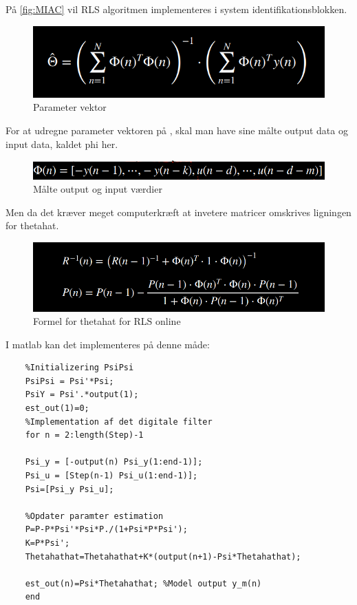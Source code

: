 På \autoref{fig:MIAC} vil RLS algoritmen implementeres i system identifikationsblokken.

\begin{figure}[H]
	\centering
	\includegraphics[width = 400pt]{Img/ParameterVektor.png}
	\caption{Parameter vektor}
	\label{fig:ParameterVektor}
\end{figure}
 For at udregne parameter vektoren på , skal man have sine målte output data og input data, kaldet phi her.
 
 \begin{figure}[H]
 	\centering
 	\includegraphics[width = 400pt]{Img/InputOutput.png}
 	\caption{Målte output og input værdier}
 	\label{fig:InputOutput}
 \end{figure}
 Men da det kræver meget computerkræft at invetere matricer omskrives ligningen for thetahat.
 
  \begin{figure}[H]
 	\centering
 	\includegraphics[width = 400pt]{Img/P_rls.png}
 	\caption{Formel for thetahat for RLS online}
 	\label{fig:P_rls}
 \end{figure}
 
 I matlab kan det implementeres på denne måde:
 
 \begin{lstlisting}
 	%Initializering PsiPsi
 	PsiPsi = Psi'*Psi;
 	PsiY = Psi'.*output(1);
 	est_out(1)=0;
 	%Implementation af det digitale filter
 	for n = 2:length(Step)-1
 	
 	Psi_y = [-output(n) Psi_y(1:end-1)];
 	Psi_u = [Step(n-1) Psi_u(1:end-1)];
 	Psi=[Psi_y Psi_u];
 	
 	%Opdater paramter estimation
 	P=P-P*Psi'*Psi*P./(1+Psi*P*Psi');
 	K=P*Psi';
 	Thetahathat=Thetahathat+K*(output(n+1)-Psi*Thetahathat);
 	
 	est_out(n)=Psi*Thetahathat; %Model output y_m(n)
 	end
 \end{lstlisting}